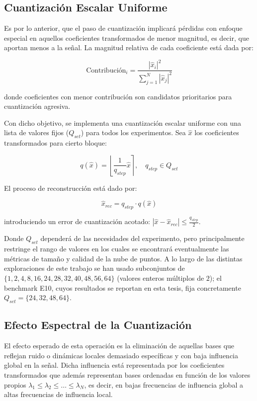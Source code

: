     \subsection{Cuantización Escalar Uniforme}
    
    Es por lo anterior, que el paso de cuantización implicará pérdidas con enfoque especial en aquellos coeficientes transformados de menor magnitud, es decir, que aportan menos a la señal. La magnitud relativa de cada coeficiente está dada por:
    
    $$\text{Contribución}_i = \frac{|\hat{x}_i|^2}{\sum_{j=1}^{N} |\hat{x}_j|^2}$$
    
    donde coeficientes con menor contribución son candidatos prioritarios para cuantización agresiva.
    
    Con dicho objetivo, se implementa una cuantización escalar uniforme con una lista de valores fijos ($Q_{set}$) para todos los experimentos. Sea $\hat{x}$ los coeficientes transformados para cierto bloque:
    
    $$q(\hat{x}) = \left\lfloor \frac{1}{q_{step}}\hat{x} \right\rceil,\quad q_{step} \in Q_{set}$$
    
    El proceso de reconstrucción está dado por:
    
    $$\hat{x}_{rec} = q_{step} \cdot q(\hat{x})$$
    
    introduciendo un error de cuantización acotado: $|\hat{x} - \hat{x}_{rec}| \leq \frac{q_{step}}{2}$.
    
    Donde $Q_{set}$ dependerá de las necesidades del experimento, pero principalmente restringe el rango de valores en los cuales se encontrará eventualmente las métricas de tamaño y calidad de la nube de puntos. A lo largo de las distintas exploraciones de este trabajo se han usado subconjuntos de $\{1,2,4,8,16,24,28,32,40,48,56,64\}$ (valores enteros múltiplos de $2$); el benchmark E10, cuyos resultados se reportan en esta tesis, fija concretamente $Q_{set} = \{24, 32, 48, 64\}$.
    
    \subsection{Efecto Espectral de la Cuantización}
    
    El efecto esperado de esta operación es la eliminación de aquellas bases que reflejan ruido o dinámicas locales demasiado específicas y con baja influencia global en la señal. Dicha influencia está representada por los coeficientes transformados que además representan bases ordenadas en función de los valores propios $\lambda_1 \leq \lambda_2 \leq \ldots \leq \lambda_N$, es decir, en bajas frecuencias de influencia global a altas frecuencias de influencia local.
    
